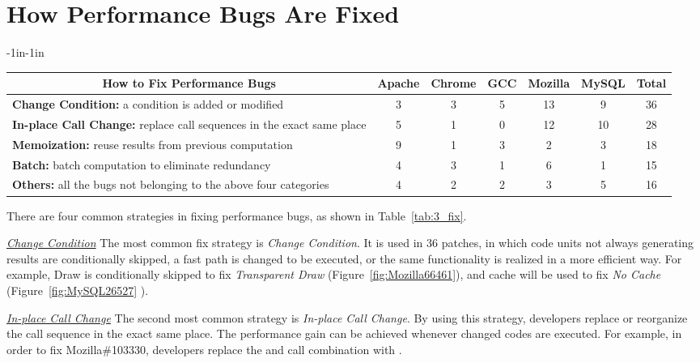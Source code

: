 \section{How Performance Bugs Are Fixed}
\label{sec:3_fix}

\begin{table*}[tb!]
\begin{adjustwidth}{-1in}{-1in}
\scriptsize
\centering
{
\begin{tabular}{lcccccc}
\toprule
\multicolumn{1}{c}{\bf How to Fix Performance Bugs} &Apache&Chrome&GCC&Mozilla&MySQL&Total\\
\midrule
\multicolumn{1}{l}{{\bf Change Condition:} {a condition is added or modified} }
&3&3&5&13&9&36\\
\midrule
\multicolumn{1}{l}{{\bf In-place Call Change:} {replace call sequences in the exact same place} }
&5&1&0&12&10&28\\
\midrule
\multicolumn{1}{l}{{\bf Memoization:} {reuse results from previous computation}}
&9&1&3&2&3&18\\
\midrule
 \multicolumn{1}{l}{{\bf Batch:} {batch computation to eliminate redundancy}}
&4&3&1&6&1&15\\
\midrule
\multicolumn{1}{l}{{\bf Others:} all the bugs not belonging to the above four categories}
&4&2&2&3&5&16\\
\bottomrule
\end{tabular}
}
\end{adjustwidth}
\caption{How to fix performance bugs in Section~\ref{sec:3_fix}.}
\label{tab:3_fix}
\end{table*}

There are four common strategies in fixing performance bugs, as shown in Table~\ref{tab:3_fix}.

\underline{\it Change Condition} The most common fix strategy is {\it Change Condition}. 
It is used in 36 patches, in which code units not always generating 
results are conditionally skipped, 
a fast path is changed to be executed, or the same functionality is realized in a more efficient way. 
For example, Draw is conditionally skipped to fix {\it Transparent Draw} (Figure~\ref{fig:Mozilla66461}), 
and cache will be used to fix {\it No Cache} (Figure~\ref{fig:MySQL26527} ).

\underline{\it In-place Call Change} 
The second most common strategy is {\it In-place Call Change}. 
By using this strategy, 
developers replace or reorganize the call sequence in the exact same place. 
The performance gain can be achieved whenever changed codes are executed. 
For example, in order to fix Mozilla\#103330, 
developers replace the  and  call combination with .

